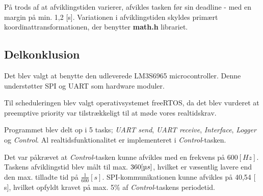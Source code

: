 
På trods af at afviklingstiden varierer, afvikles tasken før sin deadline - med en margin på min. 1,2 [s]. 
Variationen i afviklingstiden skyldes primært koordinattransformationen, der benytter \textbf{math.h} librariet. 

\subsection{Delkonklusion}
Det blev valgt at benytte den udleverede LM3S6965 microcontroller. Denne understøtter SPI og UART som hardware moduler. 

Til scheduleringen blev valgt operativsystemet freeRTOS, da det blev vurderet at preemptive priority var tilstrækkeligt til at møde vores realtidskrav. 

Programmet blev delt op i 5 tasks; \textit{UART send}, \textit{UART receive}, \textit{Interface}, \textit{Logger} og \textit{Control}. 
Al realtidsfunktionalitet er implementeret i \textit{Control}-tasken. 

Det var påkrævet at \textit{Control}-tasken kunne afvikles med en frekvens på $600 [Hz]$. 
Taskens afviklingstid blev målt til max. $360 [\micro s]$, hvilket er væsentlig lavere end den max. tilladte tid på $\frac{1}{600}  [s]$. 
SPI-kommunikationen kunne afvikles på 40,54 [ \micro s], hvilket opfyldt kravet på max. 5\% af \textit{Control}-taskens periodetid. 



